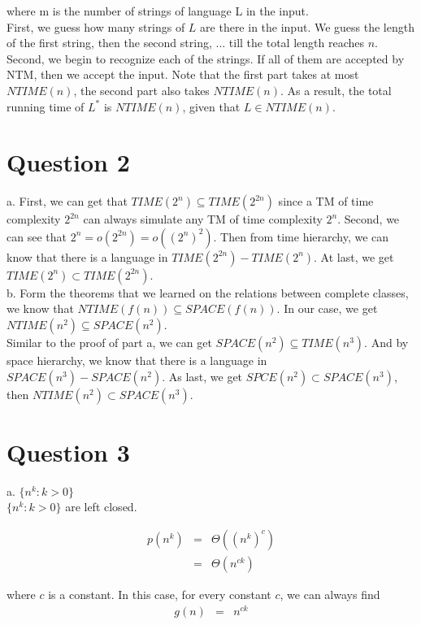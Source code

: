 \documentclass[12pt]{article}
\begin{document}
where m is the number of strings of language L in the input. \\

First, we guess how many strings of $L$ are there in the input. We
guess the length of the first string, then the second string, ... till
the total length reaches $n$. Second, we begin to recognize each of
the strings. If all of them are accepted by NTM, then we accept the
input. Note that the first part takes at most $NTIME(n)$, the second
part also takes $NTIME(n)$. As a result, the total running time of
$L^*$ is $NTIME(n)$, given that $L \in NTIME(n)$.

\section*{Question 2}

a. First, we can get that $TIME(2^n) \subseteq TIME(2^{2n})$ since
a TM of time complexity $2^{2n}$ can always simulate any TM of time
complexity $2^n$. Second, we can see that $2^n = o(2^{2n}) =
o((2^n)^2)$. Then from time hierarchy, we can know that there is a
language in $TIME(2^{2n}) - TIME(2^n)$. At last, we get $TIME(2^n)
\subset TIME(2^{2n})$. \\

b. Form the theorems that we learned on the relations between complete
classes, we know that $NTIME(f(n)) \subseteq SPACE(f(n))$. In our
case, we get $NTIME(n^2) \subseteq SPACE(n^2)$. \\

Similar to the proof of part a, we can get $SPACE(n^2) \subseteq
TIME(n^3)$. And by space hierarchy, we know that there is a language
in $SPACE(n^3) - SPACE(n^2)$. As last, we get $SPCE(n^2) \subset
SPACE(n^3)$, then $NTIME(n^2) \subset SPACE(n^3)$.

\section*{Question 3}

a. $\{n^k : k > 0 \}$ \\

$\{n^k : k > 0 \}$ are left closed.

\begin{eqnarray*}
  p(n^k) &=& \Theta {((n^k)^c)} \\
  &=& \Theta {(n^{ck})}
\end{eqnarray*}

where $c$ is a constant. In this case, for every constant $c$, we can
always find
\begin{eqnarray*}
  g(n) &=& n^{ck}
\end{eqnarray*}
\end{document}
